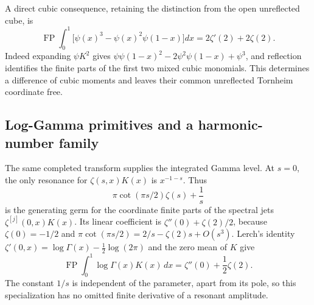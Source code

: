 A direct cubic consequence, retaining the distinction from the open
unreflected cube, is
\begin{equation}\label{ct:cubic-difference}
 \operatorname{FP}\int_0^1
 \bigl[\psi(x)^3-\psi(x)^2\psi(1-x)\bigr]dx
      =2\zeta'(2)+2\zeta(2).
\end{equation}
Indeed expanding $\psi K^2$ gives
$\psi\psi(1-x)^2-2\psi^2\psi(1-x)+\psi^3$, and reflection identifies
the finite parts of the first two mixed cubic monomials. This determines
a difference of cubic moments and leaves their common unreflected
Tornheim coordinate free.

\subsection{Log-Gamma primitives and a harmonic-number family}

The same completed transform supplies the integrated Gamma level.
At $s=0$, the only resonance for $\zeta(s,x)K(x)$ is $x^{-1-s}$.
Thus
\[
 \pi\cot(\pi s/2)\zeta(s)+\frac1s
\]
is the generating germ for the coordinate finite parts of the spectral
jets $\zeta^{[j]}(0,x)K(x)$. Its linear coefficient is
$\zeta''(0)+\zeta(2)/2$, because
$\zeta(0)=-1/2$ and
$\pi\cot(\pi s/2)=2/s-\zeta(2)s+O(s^3)$.
Lerch's identity \cite[Eq.~25.11.18]{DLMFHurwitz} $\zeta'(0,x)=\log\Gamma(x)-\tfrac12\log(2\pi)$
and the zero mean of $K$ give
\begin{equation}\label{ct:loggamma-K}
 \operatorname{FP}\int_0^1\log\Gamma(x)K(x)\,dx
       =\zeta''(0)+\frac12\zeta(2).
\end{equation}
The constant $1/s$ is independent of the parameter, apart from its
pole, so this specialization has no omitted finite derivative of a
resonant amplitude.

